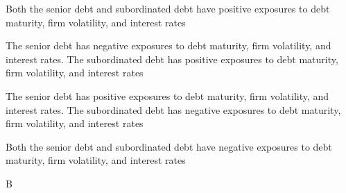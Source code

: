\documentclass{article}
\begin{document}
\begin{choices}
    \item Both the senior debt and subordinated debt have positive exposures to debt maturity, firm volatility, and interest rates
    \item The senior debt has negative exposures to debt maturity, firm volatility, and interest rates. The subordinated debt has positive exposures to debt maturity, firm volatility, and interest rates
    \item The senior debt has positive exposures to debt maturity, firm volatility, and interest rates. The subordinated debt has negative exposures to debt maturity, firm volatility, and interest rates
    \item Both the senior debt and subordinated debt have negative exposures to debt maturity, firm volatility, and interest rates
\end{choices}

\begin{correctanswer}
    B
\end{correctanswer}
\end{document}

